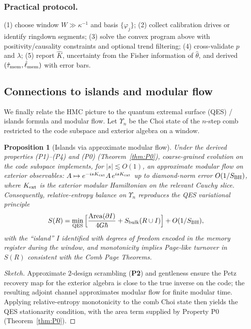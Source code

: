 \documentclass[aps,prd,preprint,onecolumn,superscriptaddress,nofootinbib,longbibliography,floatfix,11pt,showpacs,showkeys]{revtex4-2}
\newcommand{\Ptwo}{\textbf{P2}\xspace}
\newcommand{\HMC}{\textsc{HMC}\xspace}
\theoremstyle{plain}
\newtheorem{proposition}[theorem]{Proposition}
\theoremstyle{definition}
\theoremstyle{remark}
\begin{document}
\subsubsection{Practical protocol.} (1) choose window $W\gg \kappa^{-1}$ and basis $\{\varphi_j\}$; (2) collect calibration drives or
identify ringdown segments; (3) solve the convex program above with positivity/causality constraints and optional trend filtering;
(4) cross-validate $p$ and $\lambda$; (5) report $\hat K$, uncertainty from the Fisher information of $\hat\theta$, and derived
$(\hat\tau_{\rm mem},\hat\ell_{\rm mem})$ with error bars.

\subsection{Connections to islands and modular flow}
\label{sec:islands-modular}
We finally relate the \HMC{} picture to the quantum extremal surface (QES) / islands formula and modular flow.
Let $\Upsilon_{n}$ be the Choi state of the $n$-step comb restricted to the code subspace and exterior algebra on a window.
\begin{proposition}[Islands via approximate modular flow]\label{prop:islands-modular}
Under the derived properties (P1)--(P4) and (P0) (Theorem~\ref{thm:P0}), coarse-grained evolution on the code subspace implements, for $|s|\lesssim O(1)$,
an \emph{approximate modular flow} on exterior observables: $A\mapsto e^{-isK_{\rm ext}}A\,e^{isK_{\rm ext}}$ up to
diamond-norm error $O(1/S_{\rm BH})$, where $K_{\rm ext}$ is the exterior modular Hamiltonian on the relevant Cauchy slice.
Consequently, relative-entropy balance on $\Upsilon_{n}$ reproduces the QES variational principle
\begin{equation}
S(R)=\min_{\rm QES}\Big[\frac{{\rm Area}(\partial I)}{4G\hbar}+S_{\rm bulk}(R\cup I)\Big] + O(1/S_{\rm BH}),
\end{equation}
with the ``island'' $I$ identified with degrees of freedom encoded in the memory register during the window, and
monotonicity implies Page-like turnover in $S(R)$ consistent with the Comb Page Theorems.
\end{proposition}
\begin{proof}[Sketch]
Approximate $2$-design scrambling (\Ptwo) and gentleness ensure the Petz recovery map for the exterior algebra is close to the true
inverse on the code; the resulting adjoint channel approximates modular flow for finite modular time. Applying relative-entropy
monotonicity to the comb Choi state then yields the QES stationarity condition, with the area term supplied by Property P0 (Theorem~\ref{thm:P0}).
\end{proof}
\end{document}
